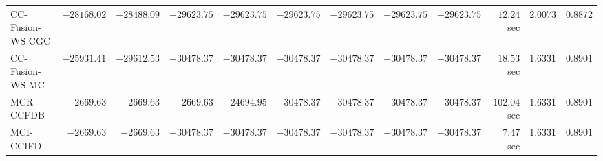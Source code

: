 \begin{table}[H]
\begin{tabular}{lrrrrrrrrrrr}
    CC-Fusion-WS-CGC & $    -28168.02$ & $    -28488.09$ & $    -29623.75$ & $    -29623.75$ & $    -29623.75$ & $    -29623.75$ & $    -29623.75$ & $    -29623.75$ & $        12.24$ sec    & $       2.0073$  & $       0.8872$ \\ 
     CC-Fusion-WS-MC & $    -25931.41$ & $    -29612.53$ & $    -30478.37$ & $    -30478.37$ & $    -30478.37$ & $    -30478.37$ & $    -30478.37$ & $    -30478.37$ & $        18.53$ sec    & $       1.6331$  & $       0.8901$ \\ 
\cmidrule{1-1} 
           MCR-CCFDB & $     -2669.63$ & $     -2669.63$ & $     -2669.63$ & $    -24694.95$ & $    -30478.37$ & $    -30478.37$ & $    -30478.37$ & $    -30478.37$ & $       102.04$ sec    & $       1.6331$  & $       0.8901$ \\ 
\cmidrule{1-1} 
           MCI-CCIFD & $     -2669.63$ & $     -2669.63$ & $    -30478.37$ & $    -30478.37$ & $    -30478.37$ & $    -30478.37$ & $    -30478.37$ & $    -30478.37$ & $         7.47$ sec    & $       1.6331$  & $       0.8901$ \\ 
\bottomrule
\end{tabular}
\end{table}

